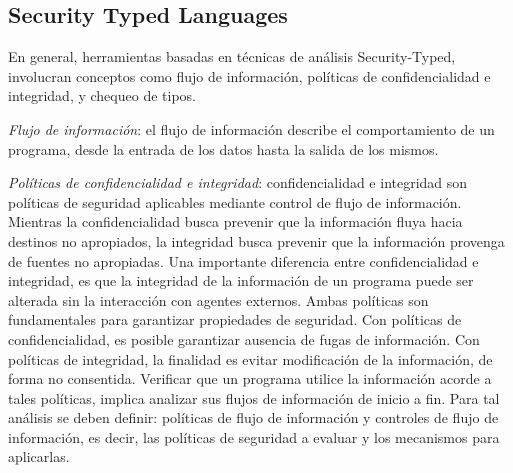 \subsection{Security Typed Languages}
En general, herramientas basadas en técnicas de análisis
Security-Typed, involucran conceptos como flujo de información, políticas de
confidencialidad e integridad, y chequeo de tipos.

\emph{Flujo de información}: el flujo de información describe el
comportamiento de un programa, desde la entrada de los datos hasta la salida de
los mismos. 

\emph{Políticas de confidencialidad e integridad}: confidencialidad e integridad
son políticas de seguridad aplicables mediante control de flujo de información.
Mientras la confidencialidad busca prevenir que la información fluya hacia
destinos no apropiados, la integridad busca prevenir que la información provenga
de fuentes no apropiadas\cite{LanguageIFS-2013}. Una importante diferencia
entre confidencialidad e integridad, es que la integridad de la información de un programa puede ser
alterada sin la interacción con agentes externos.\newline %
Ambas políticas son fundamentales para garantizar propiedades de
seguridad.\newline 
Con políticas de confidencialidad, es posible garantizar ausencia de fugas de
información. Con políticas de integridad, la finalidad es evitar
modificación de la información, de forma no consentida.\newline 
Verificar que un programa utilice la información acorde a
tales políticas, implica analizar sus flujos de información de inicio a fin.
Para tal análisis se deben definir: políticas de flujo de información y
controles de flujo de información, es decir, las políticas de seguridad a
evaluar y los mecanismos para aplicarlas. 


